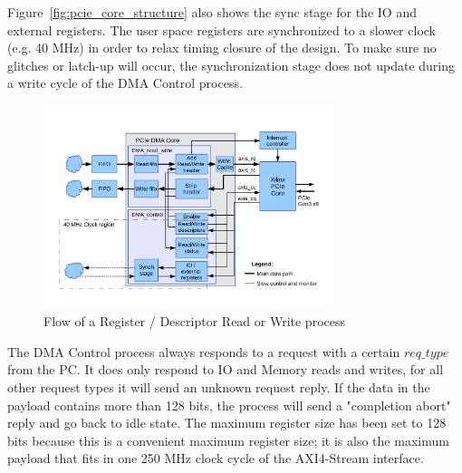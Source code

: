 Figure~\ref{fig:pcie_core_structure} also shows the sync stage for the IO and external registers. The user space registers are synchronized to a slower clock (e.g. 40 MHz) in order to relax timing closure of the design. To make sure no glitches or latch-up will occur, the synchronization stage does not update during a write cycle of the DMA Control process.
\begin{figure}[H]
\centering
\includegraphics[trim=0mm 2cm 0mm 1cm, width=0.75\textwidth, page=2]{pictures/dma_core_structure.pdf}
\caption{Flow of a Register / Descriptor Read or Write process}
\label{fig:flow_dma_control}
\end{figure}
The DMA Control process always responds to a request with a certain $req\_type$ from the PC. It does only respond to IO and Memory reads and writes, for all other request types it will send an unknown request reply. If the data in the payload contains more than 128 bits, the process will send a "completion abort" reply and go back to idle state. The maximum register size has been set to 128 bits because this is a convenient maximum register size; it is also the maximum payload that fits in one 250 MHz clock cycle of the AXI4-Stream interface.

